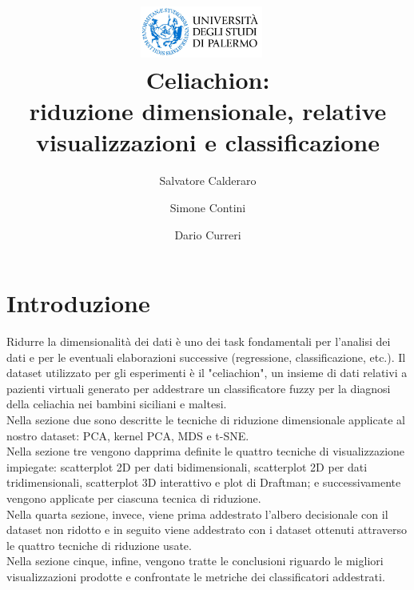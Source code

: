 \documentclass[11pt,a4paper,twocolumn]{article}
\author{Salvatore Calderaro \and Simone Contini \and Dario Curreri}
\title{%
\includegraphics[width=0.3\textwidth]{img/unipa.jpg}{\centering}~
\\
Celiachion:\\
riduzione dimensionale, relative visualizzazioni e classificazione
}
\begin{document}
\date{}
\section{Introduzione}
Ridurre la dimensionalità dei dati è uno dei task fondamentali per l'analisi dei dati e per le eventuali elaborazioni successive (regressione, classificazione, etc.). Il dataset utilizzato per gli esperimenti è il "celiachion", un insieme di dati relativi a pazienti virtuali generato per addestrare un classificatore fuzzy per la diagnosi della celiachia nei bambini siciliani e maltesi.\\ 
Nella sezione due sono descritte le tecniche di riduzione dimensionale applicate al nostro dataset: PCA, kernel PCA, MDS e t-SNE.\\
Nella sezione tre vengono dapprima definite le quattro tecniche di visualizzazione impiegate: scatterplot 2D per dati bidimensionali, scatterplot 2D per dati tridimensionali, scatterplot 3D interattivo e plot di Draftman; e successivamente vengono applicate per ciascuna tecnica di riduzione. \\
Nella quarta sezione, invece, viene prima addestrato l'albero decisionale con il  dataset non ridotto e in seguito viene addestrato con i dataset ottenuti attraverso le quattro tecniche di riduzione usate.\\ Nella sezione cinque, infine, vengono tratte le conclusioni riguardo le migliori visualizzazioni prodotte e confrontate le metriche dei classificatori addestrati.
\end{document}
